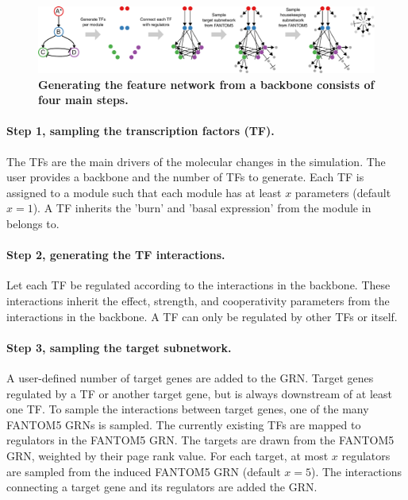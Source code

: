 \begin{figure}[htb!]
	\centering
	\includegraphics[width=\linewidth]{fig/gen_feature_network} 
	\caption{
		\textbf{Generating the feature network from a backbone consists of four main steps.}
	}
	\label{fig:gen_feature_network}
\end{figure}

\paragraph{Step 1, sampling the transcription factors (TF).} The TFs are the main drivers of the molecular changes in the simulation. The user provides a backbone and the number of TFs to generate. Each TF is assigned to a module such that each module has at least $x$ parameters (default $x=1$). A TF inherits the 'burn' and 'basal expression' from the module in belongs to.

\paragraph{Step 2, generating the TF interactions.} Let each TF be regulated according to the interactions in the backbone. These interactions inherit the effect, strength, and cooperativity parameters from the interactions in the backbone. A TF can only be regulated by other TFs or itself.

\paragraph{Step 3, sampling the target subnetwork.} 
A user-defined number of target genes are added to the GRN. Target genes regulated by a TF or another target gene, but is always downstream of at least one TF. To sample the interactions between target genes, one of the many FANTOM5\cite{lizio_gatewaysfantom5promoter_2015} GRNs is sampled. The currently existing TFs are mapped to regulators in the FANTOM5 GRN. The targets are drawn from the FANTOM5 GRN, weighted by their page rank value. For each target, at most $x$ regulators are sampled from the induced FANTOM5 GRN (default $x=5$). The interactions connecting a target gene and its regulators are added the GRN.


